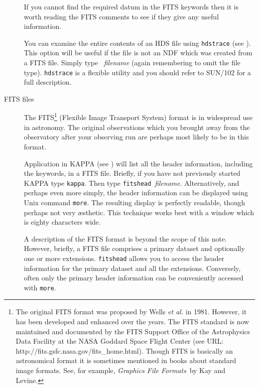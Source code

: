 \documentclass[twoside,11pt,nolof]{starlink}
\begin{document}
\begin{description}
\begin{description}
  \end{description}

   If you cannot find the required datum in the FITS keywords then it
   is worth reading the FITS comments to see if they give any useful
   information.

   You can examine the entire contents of an HDS file using \texttt{hdstrace}
   (see \cite{SUN102}).  This option will be
   useful if the file is not an NDF which was created from a
   FITS file.  Simply type
   ~\textit{filename} (again
   remembering to omit the file type).  \texttt{hdstrace} is a flexible
   utility and you should refer to SUN/102 for a full description.

  \item[FITS files] The FITS\footnote{The original FITS format was
   proposed by Wells \textit{et al.}\/\cite{WELLS81} in 1981.  However, it
   has been developed and enhanced over the years.  The FITS
   standard is now maintained and documented by the FITS Support Office
   of the Astrophysics Data Facility at the NASA Goddard Space Flight
   Center (see URL: 
   {http://fits.gsfc.nasa.gov/fits_home.html}).
   Though FITS is basically an astronomical format it is sometimes
   mentioned in books about standard image formats.  See, for example,
   \textit{Graphics File Formats}\, by Kay and Levine\cite{KAY95}.} (Flexible
   Image Transport System) format is in widespread use in astronomy.  The
   original observations which you brought away from the observatory after
   your observing run are perhaps most likely to be in this format.

   Application  in KAPPA (see
   \cite{SUN95}) will list all the header
   information, including the keywords, in a FITS file.  Briefly, if you
   have not previously started KAPPA type \texttt{kappa}.  Then type \texttt{fitshead}~\textit{filename}.  Alternatively, and perhaps even more
   simply, the header information can be displayed using Unix command
   \texttt{more}.  The resulting display is perfectly readable, though
   perhaps not very \ae sthetic.  This technique works best with a
   window which is eighty characters wide.

   A description of the FITS format is beyond the scope of this note.
   However, briefly, a FITS file comprises a primary dataset and
   optionally one or more extensions.  \texttt{fitshead} allows you to access
   the header information for the primary dataset and all the
   extensions.  Conversely, often only the primary header information
   can be conveniently accessed with \texttt{more}.


\end{description}
\end{document}
